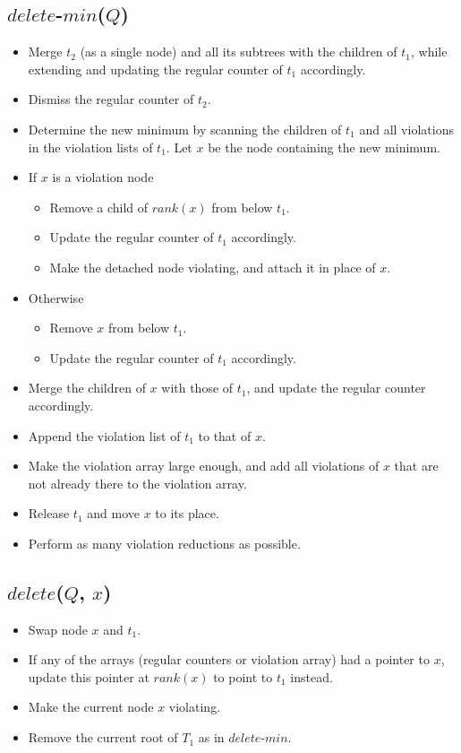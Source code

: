 \documentclass{llncs}
\newcommand{\Deletemin}{\mbox{$\mathit{delete}$\mbox{\rm -}$\mathit{min}$}}
\newcommand{\Delete}{\mbox{$\mathit{delete}$}}
\begin{document}
\subsection*{\Deletemin{}($Q$)}

\begin{itemize}
\item Merge $t_2$ (as a single node) and all its subtrees with the children of $t_1$,
while extending and updating the regular counter of $t_1$ accordingly.
\item Dismiss the regular counter of $t_2$.
\item Determine the new minimum by scanning the children of
$t_1$ and all violations in the violation lists of $t_1$. Let $x$ be
  the node containing the new minimum.
\item If $x$ is a violation node
 \begin{itemize}
   \item Remove a child of $rank(x)$ from below $t_1$.
   \item Update the regular counter of $t_1$ accordingly.
   \item Make the detached node violating, and attach it in place of $x$.
 \end{itemize}  
\item Otherwise
 \begin{itemize}
   \item Remove $x$ from below $t_1$.
   \item Update the regular counter of $t_1$ accordingly.
 \end{itemize}
\item Merge the children of $x$ with those of $t_1$,
			and update the regular counter accordingly.
\item Append the violation list of $t_1$ to that of $x$.
\item Make the violation array large enough, and add all
  violations of $x$ that are not already there to the violation array.
\item Release $t_1$ and move $x$ to its place.
\item Perform as many violation reductions as possible.
\end{itemize}

\subsection*{\Delete{}($Q$, $x$)}
\begin{itemize}
\item Swap node $x$ and $t_1$.
\item If any of the arrays (regular counters or violation array) had a pointer
  to $x$, update this pointer at $\mathit{rank}(x)$ to point to $t_1$
  instead. 
\item Make the current node $x$ violating.
\item Remove the current root of $T_1$ as in \Deletemin{}. 
\end{itemize}
\end{document}
